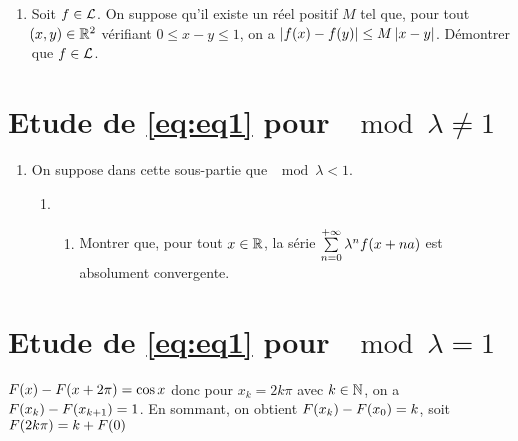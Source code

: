 \documentclass[a4paper,french,bookmarks]{article}
\begin{document}
\begin{enumerate}
        \item Soit $f \in \mathcal{L}$. On suppose qu'il existe un réel positif $M$ tel que, pour tout $\!\left(x, y\right) \in \mathbb{R}^2$ vérifiant $0 \leq x - y \leq 1$, on a $\left\lvert f\!\left(x\right) - f\!\left(y\right)\right\rvert \leq M\left\lvert x - y\right\rvert$. Démontrer que $f \in \mathcal{L}$.
        
        \noafter
        \nobefore\yesafter
        \yesbefore
    \end{enumerate}
    
    \section{Etude de \eqref{eq:eq1} pour $\mod{\lambda} \neq 1$}\label{sec:sec3}
    
    \begin{enumerate}
        \item On suppose dans cette sous-partie que $\mod{\lambda} < 1$.
        
        \begin{enumerate}
            \item \begin{enumerate}
                \item Montrer que, pour tout $x \in \mathbb{R}$, la série $\sum\limits_{n=0}^{+\infty} \lambda^n f\!\left(x + na\right)$ est absolument convergente.
                
            \end{enumerate}
        \end{enumerate}
    \end{enumerate}
    
    \section{Etude de \eqref{eq:eq1} pour $\mod{\lambda} = 1$}\label{sec:sec4}
    $F\!\left(x\right) - F\!\left(x + 2\pi\right) = \cos{x}$ donc pour $x_k = 2k\pi$ avec $k \in \mathbb{N}$, on a $F\!\left(x_k\right) - F\!\left(x_{k+1}\right) = 1$. En sommant, on obtient $F\!\left(x_k\right) - F\!\left(x_0\right) = k$, soit $F\!\left(2k\pi\right) = k + F\!\left(0\right)$
\end{document}
